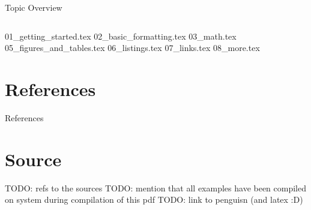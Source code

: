 



\begin{frame}{Topic Overview}
\begin{columns}[c,onlytextwidth]
\tableofcontents[sections={1-4}]
\tableofcontents[sections={5-8}]
\end{columns}
\end{frame}

{01_getting_started.tex}
{02_basic_formatting.tex}
{03_math.tex}
{05_figures_and_tables.tex}
{06_listings.tex}
{07_links.tex}
{08_more.tex}

\appendix
\beginbackup

\section{References}
\begin{frame}[allowframebreaks]{References}
\printbibliography
\end{frame}


\section{Source}
\begin{frame}
   TODO: refs to the sources
   TODO: mention that all examples have been compiled on system during compilation of this pdf
   TODO: link to penguisn (and latex :D)
\end{frame}
\backupend


